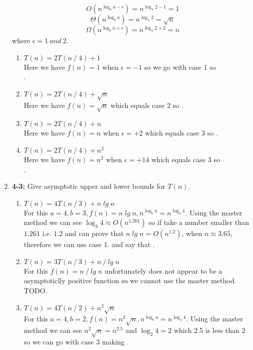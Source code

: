 \documentclass{article}
\begin{document}
\begin{enumerate}
    \[O(n^{\log_b a-\epsilon}) = n^{\log_4 2-1} = 1\]
    \[\Theta(n^{\log_b a}) = n^{\log_4 2} = \sqrt{n}\] 
    \[\Omega(n^{\log_b a+\epsilon}) = n^{\log_4 2+2} = n\]
    where $\epsilon = 1\:and\:2$.
    \begin{enumerate}
      \itemsep1em 
      \item $T(n) = 2T(n \mathbin{/} 4) + 1$ \\
      Here we have $f(n) = 1$ when $\epsilon = -1$ so we go with case 1 so \\ .
      \item $T(n) = 2T(n \mathbin{/} 4) + \sqrt{n}$ \\
      Here we have $f(n) = \sqrt{n}$ which equals case 2 so .
      \item $T(n) = 2T(n \mathbin{/} 4) + n$ \\
      Here we have $f(n) = n$ when $\epsilon = +2$ which equals case 3 so . 
      \item $T(n) = 2T(n \mathbin{/} 4) + n^2$ \\
      Here we have $f(n) = n^2$ when $\epsilon = +14$ which equals case 3 so \\ .
    \end{enumerate}

    \item \textbf{4-3:} Give asymptotic upper and lower bounds for $T(n)$.
    \begin{enumerate}
      \itemsep1em 
      \item $T(n) = 4T(n \mathbin{/} 3) + n\;lg\;n$ \\
      For this $a = 4, b = 3, f(n) = n\;lg\;n, n^{\log_b a} = n^{\log_3 4}$. Using the master method we can see $\log_3 4 \approx O(n^{1.261})$ 
      so if take a number smaller than $1.261$ i.e. $1.2$ and can prove that $n\;lg\;n = O(n^{1.2})$, when $n \approx 3.65$, therefore we can use case 1.
      and say that .

      \item $T(n) = 3T(n \mathbin{/} 3) + n \mathbin{/} lg\;n$ \\
      For this $f(n) = n \mathbin{/} lg\;n$ unfortunately does not appear to be a asymptoticlly positive function so we cannot use the master method. TODO.

      \item $T(n) = 4T(n \mathbin{/} 2) + n^2 \sqrt{n}$ \\
      For this $a = 4, b = 2, f(n) = n^2 \sqrt{n}, n^{\log_b a} = n^{\log_2 4}$. 
      Using the master method we can see $n^2 \sqrt{n} = n^{2.5}$ and $\log_2 4 = 2$ 
      which 2.5 is less than 2 so we can go with case 3 making .


\end{enumerate}
\end{enumerate}
\end{document}
